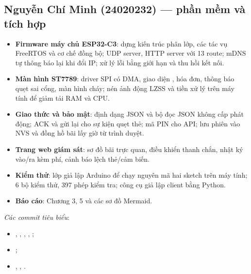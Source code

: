 \subsection{Nguyễn Chí Minh (24020232) — phần mềm và tích hợp}
\begin{itemize}
  \item \textbf{Firmware máy chủ ESP32-C3}: dựng kiến trúc phân lớp, các tác vụ FreeRTOS
        và cơ chế đồng bộ; UDP server, HTTP server với 13 route; mDNS
         tự thông báo lại khi đổi IP; xử lý lỗi 
        bằng giới hạn và thu hồi kết nối.
  \item \textbf{Màn hình ST7789}: driver SPI có DMA, giao diện , hóa đơn,
        thông báo quẹt sai cổng, màn hình cháy; nén ảnh động LZSS và tiền xử lý trên máy
        tính để giảm tải RAM và CPU.
  \item \textbf{Giao thức và bảo mật}: định dạng JSON và bộ đọc JSON không cấp phát động;
        ACK và gửi lại cho sự kiện quẹt thẻ; mã PIN cho
        API; lưu phiên vào NVS và đồng hồ bãi lấy giờ từ trình duyệt.
  \item \textbf{Trang web giám sát}: sơ đồ bãi trực quan, điều khiển thanh chắn, nhật ký
        vào/ra kèm phí, cảnh báo lệch thẻ/cảm biến.
  \item \textbf{Kiểm thử}: lớp giả lập Arduino để chạy nguyên mã hai sketch trên máy tính;
        6 bộ kiểm thử, 397 phép kiểm tra; công cụ giả lập client bằng Python.
  \item \textbf{Báo cáo}: Chương 3, 5 và các sơ đồ Mermaid.
\end{itemize}
\textit{Các commit tiêu biểu}:
\begin{itemize}[nosep]
  \item {}, , ,
        , ;
  \item {};
  \item {}, ,
        .
\end{itemize}


